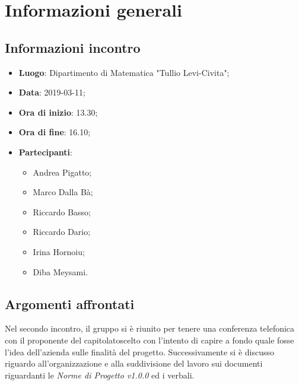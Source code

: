 \section{Informazioni generali}

\subsection{Informazioni incontro}
\begin{itemize}
	\item \textbf{Luogo}: Dipartimento di Matematica "Tullio Levi-Civita";
	\item \textbf{Data}: 2019-03-11;
	\item \textbf{Ora di inizio}: 13.30;
	\item \textbf{Ora di fine}: 16.10;
	\item \textbf{Partecipanti}: 
	\begin{itemize}
		\item Andrea Pigatto;
		\item Marco Dalla Bà;
		\item Riccardo Basso;
		\item Riccardo Dario;
		\item Irina Hornoiu;
		\item Diba Meysami.
	\end{itemize}
\end{itemize}

\subsection{Argomenti affrontati}
Nel secondo incontro, il gruppo si è riunito per tenere una conferenza telefonica con il proponente del capitolato\glosp scelto
con l'intento di capire a fondo quale fosse l'idea dell'azienda sulle finalità del progetto. 
Successivamente si è discusso riguardo all'organizzazione e alla suddivisione del lavoro sui documenti riguardanti le \textit{Norme di Progetto v1.0.0} ed i verbali.
